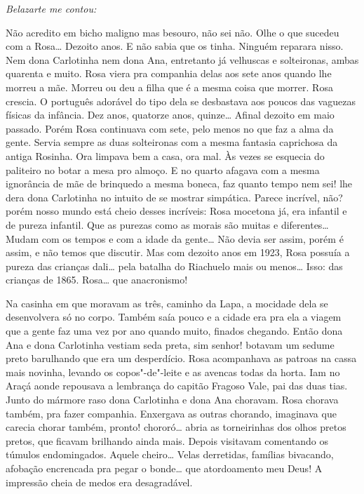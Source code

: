 \begin{linenumbers}
\emph{Belazarte me contou:}

Não acredito em bicho maligno mas besouro, não sei não. Olhe o que
sucedeu com a Rosa\ldots{} Dezoito anos. E não sabia que os tinha. Ninguém
reparara nisso. Nem dona Carlotinha nem dona Ana, entretanto já
velhuscas e solteironas, ambas quarenta e muito. Rosa viera pra
companhia delas aos sete anos quando lhe morreu a mãe. Morreu ou deu a
filha que é a mesma coisa que morrer. Rosa crescia. O português adorável
do tipo dela se desbastava aos poucos das vaguezas físicas da infância.
Dez anos, quatorze anos, quinze\ldots{} Afinal dezoito em maio passado. Porém
Rosa continuava com sete, pelo menos no que faz a alma da gente. Servia
sempre as duas solteironas com a mesma fantasia caprichosa da antiga
Rosinha. Ora limpava bem a casa, ora mal. Às vezes se esquecia do
paliteiro no botar a mesa pro almoço. E no quarto afagava com a mesma
ignorância de mãe de brinquedo a mesma boneca, faz quanto tempo nem sei!
lhe dera dona Carlotinha no intuito de se mostrar simpática. Parece
incrível, não? porém nosso mundo está cheio desses incríveis: Rosa
mocetona já, era infantil e de pureza infantil. Que as purezas como as
morais são muitas e diferentes\ldots{} Mudam com os tempos e com a idade da
gente\ldots{} Não devia ser assim, porém é assim, e não temos que discutir.
Mas com dezoito anos em 1923, Rosa possuía a pureza das crianças dali\ldots{}
pela batalha do Riachuelo mais ou menos\ldots{} Isso: das crianças de 1865.
Rosa\ldots{} que anacronismo!

Na casinha em que moravam as três, caminho da Lapa, a mocidade dela se
desenvolvera só no corpo. Também saía pouco e a cidade era pra ela a
viagem que a gente faz uma vez por ano quando muito, finados chegando.
Então dona Ana e dona Carlotinha vestiam seda preta, sim senhor! botavam
um sedume preto barulhando que era um desperdício. Rosa acompanhava as
patroas na cassa mais novinha, levando os copos"-de"-leite e as avencas
todas da horta. Iam no Araçá aonde repousava a lembrança do capitão
Fragoso Vale, pai das duas tias. Junto do mármore raso dona Carlotinha e
dona Ana choravam. Rosa chorava também, pra fazer companhia. Enxergava
as outras chorando, imaginava que carecia chorar também, pronto!
chororó\ldots{} abria as torneirinhas dos olhos pretos pretos, que ficavam
brilhando ainda mais. Depois visitavam comentando os túmulos
endomingados. Aquele cheiro\ldots{} Velas derretidas, famílias bivacando,
afobação encrencada pra pegar o bonde\ldots{} que atordoamento meu Deus! A
impressão cheia de medos era desagradável.


\end{linenumbers}

